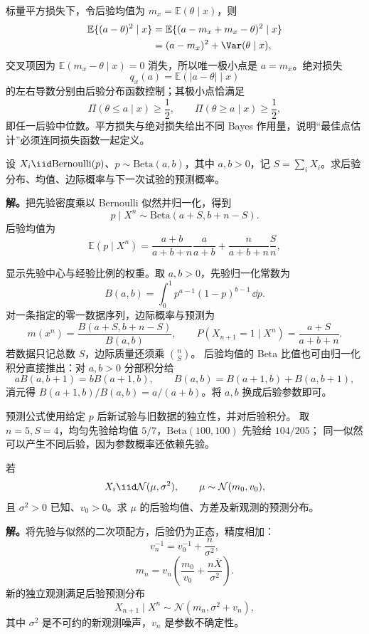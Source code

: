 标量平方损失下，令后验均值为 $m_x=\mathbb E(\theta\mid x)$，则
\begin{align*}
 \mathbb E\{(a-\theta)^2\mid x\}
 &=\mathbb E\{(a-m_x+m_x-\theta)^2\mid x\}\\
 &=(a-m_x)^2+\Var(\theta\mid x),
\end{align*}
交叉项因为 $\mathbb E(m_x-\theta\mid x)=0$ 消失，所以唯一极小点是 $a=m_x$。绝对损失
\[
 q_x(a)=\mathbb E(|a-\theta|\mid x)
\]
的左右导数分别由后验分布函数控制；其极小点恰满足
\[
 \Pi(\theta\le a\mid x)\ge\frac12,
 \qquad
 \Pi(\theta\ge a\mid x)\ge\frac12,
\]
即任一后验中位数。平方损失与绝对损失给出不同 Bayes 作用量，说明“最佳点估计”必须连同损失函数一起定义。


\begin{workedexample}
设 $X_i\iid\mathrm{Bernoulli}(p)$、$p\sim\mathrm{Beta}(a,b)$，其中 $a,b>0$，记 $S=\sum_iX_i$。求后验分布、均值、边际概率与下一次试验的预测概率。

\textbf{解。}把先验密度乘以 Bernoulli 似然并归一化，得到
\[
 p\mid X^n\sim\mathrm{Beta}(a+S,b+n-S).
\]
后验均值为
\[
 \mathbb E(p\mid X^n)
 =\frac{a+b}{a+b+n}\frac{a}{a+b}
 +\frac{n}{a+b+n}\frac{S}{n},
\]

显示先验中心与经验比例的权重。取 $a,b>0$，先验归一化常数为
\[
 B(a,b)=\int_0^1p^{a-1}(1-p)^{b-1}\,\dd p.
\]
对一条指定的零一数据序列，边际概率与预测为
\[
 m(x^n)=\frac{B(a+S,b+n-S)}{B(a,b)},\qquad
 P(X_{n+1}=1\mid X^n)=\frac{a+S}{a+b+n}.
\]
若数据只记总数 $S$，边际质量还须乘 $\binom nS$。
后验均值的 Beta 比值也可由归一化积分直接推出：对 $a,b>0$ 分部积分给
\[
 aB(a,b+1)=bB(a+1,b),\qquad B(a,b)=B(a+1,b)+B(a,b+1),
\]
消元得 $B(a+1,b)/B(a,b)=a/(a+b)$。将 $a,b$ 换成后验参数即可。

预测公式使用给定 $p$ 后新试验与旧数据的独立性，并对后验积分。
取 $n=5,S=4$，均匀先验给均值 $5/7$，$\mathrm{Beta}(100,100)$ 先验给 $104/205$；
同一似然可以产生不同后验，因为参数概率还依赖先验。

\end{workedexample}

\begin{workedexample}[正态共轭的精度相加]
若
\[
 X_i\iid\mathcal N(\mu,\sigma^2),
 \qquad
 \mu\sim\mathcal N(m_0,v_0),
\]
且 $\sigma^2>0$ 已知、$v_0>0$。求 $\mu$ 的后验均值、方差及新观测的预测分布。

\textbf{解。}将先验与似然的二次项配方，后验仍为正态，精度相加：
\[
 v_n^{-1}=v_0^{-1}+\frac{n}{\sigma^2},
\]
\[
 m_n
 =v_n\left(\frac{m_0}{v_0}
 +\frac{n\overline X}{\sigma^2}\right).
\]
新的独立观测满足后验预测分布
\[
 X_{n+1}\mid X^n
 \sim\mathcal N(m_n,\sigma^2+v_n),
\]
其中 $\sigma^2$ 是不可约的新观测噪声，$v_n$ 是参数不确定性。
\end{workedexample}

